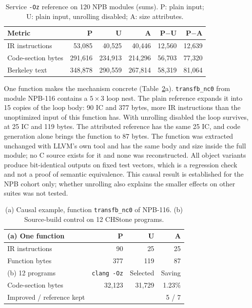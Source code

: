 \documentclass[conference,a4paper]{IEEEtran}
\begin{document}
\begin{table}[t]
\caption{Service \texttt{-Oz} reference on 120 NPB modules (sums).
P: plain input; U: plain input, unrolling disabled; A: size
attributes.}
\label{tab:causal}
\centering
\footnotesize
\setlength{\tabcolsep}{3.5pt}
\begin{tabular}{lrrrrr}
\toprule
Metric & P & U & A & P$-$U & P$-$A \\
\midrule
IR instructions    & 53,085  & 40,525  & 40,446  & 12,560 & 12,639 \\
Code-section bytes & 291,616 & 234,913 & 214,296 & 56,703 & 77,320 \\
Berkeley text      & 348,878 & 290,559 & 267,814 & 58,319 & 81,064 \\
\bottomrule
\end{tabular}
\end{table}

One function makes the mechanism concrete (Table~\ref{tab:small}a).
\texttt{transfb\_nc0} from module NPB-116 contains a $5\times3$ loop
nest. The plain reference expands it into 15 copies of the loop body:
90 IC and 377 bytes, more IR instructions than the unoptimized input
of this function has. With unrolling disabled the loop survives, at 25 IC
and 119 bytes. The attributed reference has the same 25 IC, and code
generation alone brings the function to 87 bytes. The function was
extracted unchanged with LLVM's own tool and has the same body and size
inside the full module; no C source exists for it and none was
reconstructed. All object variants produce bit-identical outputs on
fixed test vectors, which is a regression check and not a proof of
semantic equivalence. This causal result is established for the NPB
cohort only; whether unrolling also explains the smaller effects on
other suites was not tested.

\begin{table}[t]
\caption{(a) Causal example, function \texttt{transfb\_nc0} of NPB-116.
(b) Source-build control on 12 CHStone programs.}
\label{tab:small}
\centering
\footnotesize
\setlength{\tabcolsep}{4pt}
\begin{tabular}{lrrr}
\toprule
(a) One function & P & U & A \\
\midrule
IR instructions & 90 & 25 & 25 \\
Function bytes  & 377 & 119 & 87 \\
\midrule
(b) 12 programs & \texttt{clang -Oz} & Selected & Saving \\
\midrule
Code-section bytes & 32,123 & 31,729 & 1.23\% \\
Improved / reference kept & \multicolumn{3}{r}{5 / 7} \\
\bottomrule
\end{tabular}
\end{table}
\end{document}
